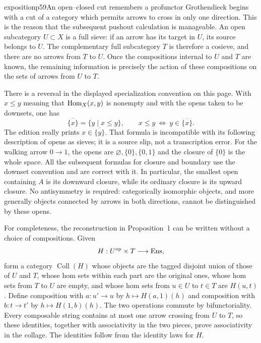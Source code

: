 
\begin{dcomment}{exposition}{p59}{An open--closed cut remembers a profunctor}
Grothendieck begins with a cut of a category which permits arrows to cross in only one direction. This is the reason that the subsequent pushout calculation is manageable. An open subcategory $U\subset X$ is a full sieve: if an arrow has its target in $U$, its source belongs to $U$. The complementary full subcategory $T$ is therefore a cosieve, and there are no arrows from $T$ to $U$. Once the compositions internal to $U$ and $T$ are known, the remaining information is precisely the action of these compositions on the sets of arrows from $U$ to $T$.

There is a reversal in the displayed specialization convention on this page. With $x\leq y$ meaning that $\mathrm{Hom}_X(x,y)$ is nonempty and with the opens taken to be downsets, one has
\[
 \overline{\{x\}}=\{y\mid x\leq y\},\qquad
 x\leq y\ \Longleftrightarrow\ y\in\overline{\{x\}}.
\]
The edition really prints $x\in\overline{\{y\}}$. That formula is incompatible with its following description of opens as sieves; it is a source slip, not a transcription error. For the walking arrow $0\to1$, the opens are $\varnothing,\{0\},\{0,1\}$ and the closure of $\{0\}$ is the whole space. All the subsequent formulas for closure and boundary use the downset convention and are correct with it. In particular, the smallest open containing $A$ is its downward closure, while its ordinary closure is its upward closure. No antisymmetry is required: categorically isomorphic objects, and more generally objects connected by arrows in both directions, cannot be distinguished by these opens.

For completeness, the reconstruction in Proposition~1 can be written without a choice of compositions. Given
\[
 H:U^{\mathrm{op}}\times T\longrightarrow\mathrm{Ens},
\]
form a category $\operatorname{Coll}(H)$ whose objects are the tagged disjoint union of those of $U$ and $T$, whose hom sets within each part are the original ones, whose hom sets from $T$ to $U$ are empty, and whose hom sets from $u\in U$ to $t\in T$ are $H(u,t)$. Define composition with $a:u'\to u$ by $h\mapsto H(a,1)(h)$ and composition with $b:t\to t'$ by $h\mapsto H(1,b)(h)$. The two operations commute by bifunctoriality. Every composable string contains at most one arrow crossing from $U$ to $T$, so these identities, together with associativity in the two pieces, prove associativity in the collage. The identities follow from the identity laws for $H$.


\end{dcomment}
